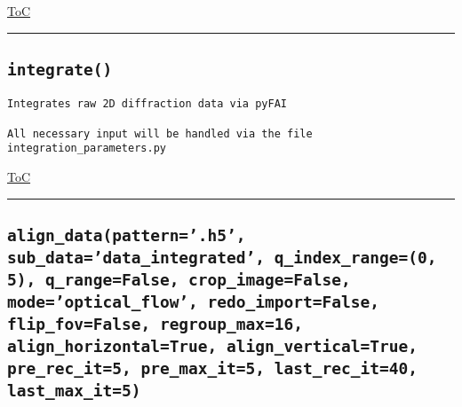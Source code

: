 \documentclass{article}
\begin{document}
\begin{flushright}

\hyperref[toc]{ToC}

\end{flushright}



\vspace{5mm}

\hrule

\subsection*{\texttt{integrate()}}

\begin{lstlisting}[language=docstring]
Integrates raw 2D diffraction data via pyFAI

All necessary input will be handled via the file integration_parameters.py
\end{lstlisting}

\begin{flushright}

\hyperref[toc]{ToC}

\end{flushright}



\vspace{5mm}

\hrule

\subsection*{\texttt{align\_data(pattern='.h5', sub\_data='data\_integrated', q\_index\_range=(0, 5), q\_range=False, crop\_image=False, mode='optical\_flow', redo\_import=False, flip\_fov=False, regroup\_max=16, align\_horizontal=True, align\_vertical=True, pre\_rec\_it=5, pre\_max\_it=5, last\_rec\_it=40, last\_max\_it=5)}}
\end{document}
